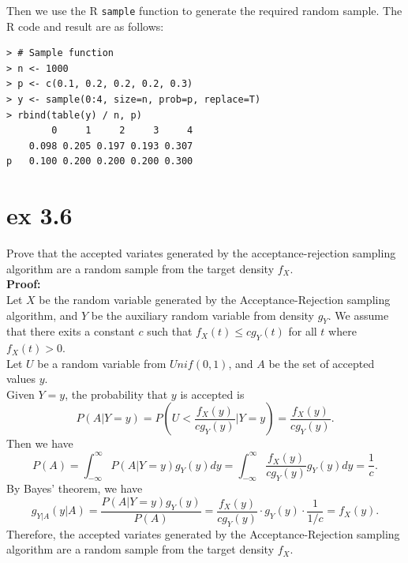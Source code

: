 \documentclass[UTF8]{ctexart}
\begin{document}
Then we use the R \texttt{sample} function to generate the required random sample. The R code and result are as follows:
\begin{lstlisting}
> # Sample function
> n <- 1000
> p <- c(0.1, 0.2, 0.2, 0.2, 0.3)
> y <- sample(0:4, size=n, prob=p, replace=T)
> rbind(table(y) / n, p)
        0     1     2     3     4
    0.098 0.205 0.197 0.193 0.307
p   0.100 0.200 0.200 0.200 0.300
\end{lstlisting}


\section{ex 3.6}
Prove that the accepted variates generated by the acceptance-rejection sampling 
algorithm are a random sample from the target density $f_X$.\\
\textbf{Proof:}\\
Let $X$ be the random variable generated by the Acceptance-Rejection sampling algorithm, and $Y$ be the auxiliary random variable from density $g_Y$.
We assume that there exits a constant $c$ such that $f_X(t) \leq cg_Y(t)$ for all $t$ where $f_X(t) > 0$.\\
Let $U$ be a random variable from $Unif(0, 1)$, and $A$ be the set of accepted values $y$.\\
Given $Y = y$, the probability that $y$ is accepted is
\begin{equation*}
    P(A|Y=y) = P(U < \frac{f_X(y)}{cg_Y(y)}|Y=y) = \frac{f_X(y)}{cg_Y(y)}.
\end{equation*}
Then we have
\begin{equation*}
    P(A)=\int_{-\infty}^{\infty}P(A|Y=y)g_Y(y)dy = \int_{-\infty}^{\infty}\frac{f_X(y)}{cg_Y(y)}g_Y(y)dy = \frac{1}{c}.
\end{equation*}
By Bayes' theorem, we have
\begin{equation*}
    g_{Y|A}(y|A) = \frac{P(A|Y=y)g_Y(y)}{P(A)} = \frac{f_X(y)}{cg_Y(y)} \cdot g_Y(y) \cdot \frac{1}{1/c} = f_X(y).
\end{equation*}
Therefore, the accepted variates generated by the Acceptance-Rejection sampling algorithm are a random sample from the target density $f_X$.
\end{document}
